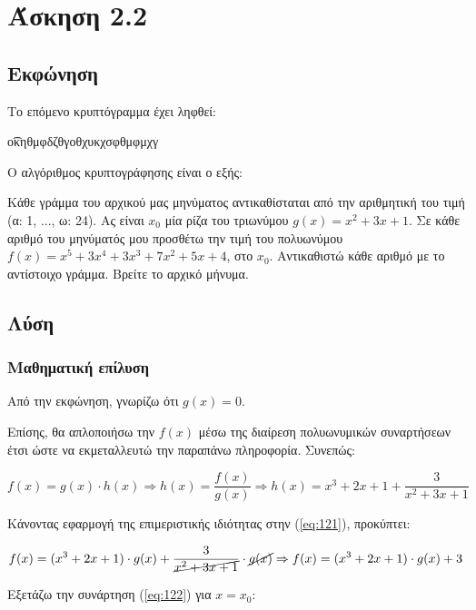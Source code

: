 \section{Άσκηση 2.2}

\subsection{Εκφώνηση} 

Το επόμενο κρυπτόγραμμα έχει ληφθεί:

\begin{center}
    \t{οκηθμφδζθγοθχυκχσφθμφμχγ}
\end{center}
Ο αλγόριθμος κρυπτογράφησης είναι ο εξής: 

Κάθε γράμμα του αρχικού μας μηνύματος αντικαθίσταται από την αριθμητική του τιμή (α: 1, ..., ω: 24). Ας είναι $x_0$ μία ρίζα του τριωνύμου $g(x) = x^2 + 3x + 1$. Σε κάθε αριθμό του μηνύματός μου προσθέτω την τιμή του πολυωνύμου $f(x) = x^5 + 3x^4 + 3x^3 + 7x^2 + 5x + 4$, στο $x_0$. Αντικαθιστώ κάθε αριθμό με το αντίστοιχο γράμμα. Βρείτε το αρχικό μήνυμα.

\subsection{Λύση}

\subsubsection{Μαθηματική επίλυση}

Από την εκφώνηση, γνωρίζω ότι $g(x) = 0$. 

Επίσης, θα απλοποιήσω την $f(x)$ μέσω της διαίρεση πολυωνυμικών συναρτήσεων έτσι ώστε να εκμεταλλευτώ την παραπάνω πληροφορία. Συνεπώς: 

\begin{equation} \label{eq:121}
    f(x) = g(x) \cdot h(x) \Rightarrow h(x) = \frac{f(x)}{g(x)} \Rightarrow h(x) = x^3+2x+1+\frac{3}{x^2+3x+1}
\end{equation}

Κάνοντας εφαρμογή της επιμεριστικής ιδιότητας στην (\ref{eq:121}), προκύπτει: 

\begin{equation} \label{eq:122}
    f(x) = (x^3+2x+1)\cdot g(x) + \frac{3}{\cancel{x^2+3x+1}}\cdot \cancel{g(x)} \Rightarrow f(x) = (x^3+2x+1) \cdot g(x) + 3
\end{equation}

Εξετάζω την συνάρτηση (\ref{eq:122}) για $x = x_0$:

